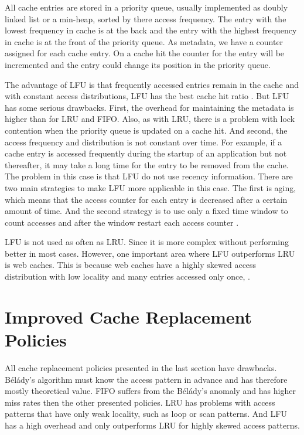 \documentclass[
	12pt,
	a4paper,
	abstract,
	bibliography=totoc,
	chapterprefix,
	headings=openright,
	numbers=endperiod,
	parskip=half,
	twoside,
]{scrreprt}
\begin{document}
All cache entries are stored in a priority queue, usually implemented as doubly linked list or a min-heap, sorted by there access frequency.
The entry with the lowest frequency in cache is at the back and the entry with the highest frequency in cache 
is at the front of the priority queue.
As metadata, we have a counter assigned for each cache entry.
On a cache hit the counter for the entry will be incremented and the entry could change its position in the priority queue.

The advantage of LFU is that frequently accessed entries remain in the cache and with constant
access distributions, LFU has the best cache hit ratio \cite{einziger2017tinylfu}.
But LFU has some  serious drawbacks.
First, the overhead for maintaining the metadata is higher than for LRU and FIFO.
Also, as with LRU, there is a problem with lock contention when the priority queue is updated on a cache hit.
And second, the access frequency and distribution is not constant over time.
For example, if a cache entry is accessed frequently during the startup of an application but not thereafter, it may take a long time for the 
entry to be removed from the cache.
The problem in this case is that LFU do not use recency information.
There are two main strategies to make LFU more applicable in this case.
The first is aging, which means that the access counter for each entry is decreased after  a certain amount of time.
And the second strategy is to use only a fixed time window to count accesses and after the window restart 
each access counter \cite{karakostas2000practical}.

LFU is not used as often as LRU.
Since it is more complex without performing better in most cases.
However, one important area where LFU outperforms LRU is web caches.
This is because web caches have a highly skewed access distribution with low locality and  
many entries accessed only once, \cite{mahanti2000traffic}.

\section{Improved Cache Replacement Policies}
\label{sec:improved cache replacement policies}

All cache replacement policies presented in the last section have drawbacks.
Bélády's algorithm must know the access pattern in advance and has therefore mostly theoretical value.
FIFO suffers from the Bélády's anomaly and has higher miss rates then the other presented policies.
LRU has problems with access patterns that have only weak locality, such as loop or scan patterns.
And LFU has a high overhead and only outperforms LRU for highly skewed access patterns. 
\end{document}
